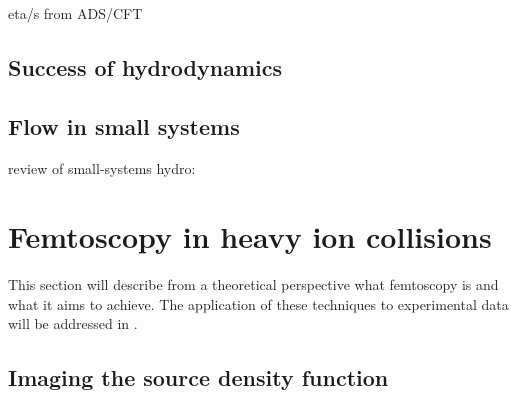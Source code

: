 eta/s from ADS/CFT \cite{Kovtun:2004de}

\subsection{Success of hydrodynamics}
\subsection{Flow in small systems}
 review of small-systems hydro: \cite{Nagle:2018nvi}



\section{Femtoscopy in heavy ion collisions}
This section will describe from a theoretical perspective what femtoscopy is and what it aims to achieve. The application of these techniques to experimental data will be addressed in .
\subsection{Imaging the source density function}
